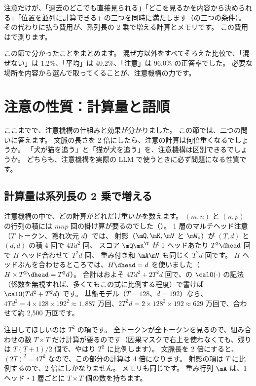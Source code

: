 注意だけが、「過去のどこでも直接見られる」「どこを見るかを内容から決められる」「位置を並列に計算できる」の三つを同時に満たします（の三つの条件）。
その代わりに払う費用が、系列長の 2 乗で増える計算とメモリです。
この費用はで測ります。

この節で分かったことをまとめます。
混ぜ方以外をすべてそろえた比較で、「混ぜない」は 1.2\%、「平均」は 40.2\%、「注意」は 96.0\% の正答率でした。
必要な場所を内容から選んで取ってくることが、注意機構の力です。

\section{注意の性質：計算量と語順}\label{sec:attn-properties}

ここまでで、注意機構の仕組みと効果が分かりました。
この節では、二つの問いに答えます。
文脈の長さを 2 倍にしたら、注意の計算は何倍重くなるでしょうか。
「犬が猫を追う」と「猫が犬を追う」を、注意機構は区別できるでしょうか。
どちらも、注意機構を実際の LLM で使うときに必ず問題になる性質です。

\subsection*{計算量は系列長の 2 乗で増える}

注意機構の中で、どの計算がどれだけ重いかを数えます。
$(m,n)$ と $(n,p)$ の行列の積には $mnp$ 回の掛け算が要るのでした（）。
1 層のマルチヘッド注意（$T$ トークン、隠れ次元 $d$）では、
射影（$\mQ,\mK,\mV$ と $\mW_o$）が $(T,d)$ と $(d,d)$ の積 4 回で $4Td^2$ 回、
スコア $\mQ\mK^\T$ が 1 ヘッドあたり $T^2\dhead$ 回で $H$ ヘッド合わせて $T^2d$ 回、
重み付き和 $\mA\mV$ も同じく $T^2d$ 回です。
$H$ ヘッドぶんを合わせるところでは、$H\dhead=d$ を使いました（$H\times T^2\dhead=T^2d$）。
合計はおよそ $4Td^2 + 2T^2d$ 回で、の $\calO(\cdot)$ の記法（係数を無視すれば、多くてもこの式に比例する程度）で書けば $\calO(Td^2 + T^2d)$ です。
基盤モデル（$T=128$、$d=192$）なら、$4Td^2=4\times128\times192^2\approx1{,}887$ 万回、$2T^2d=2\times128^2\times192\approx629$ 万回で、合わせて約 2,500 万回です。

注目してほしいのは $T^2$ の項です。
全トークンが全トークンを見るので、組み合わせの数 $T\times T$ だけ計算が要るのです（因果マスクで右上を使わなくても、残りは $T(T+1)/2$ 個で、やはり $T^2$ に比例します）。
文脈長を 2 倍にすると、$(2T)^2=4T^2$ なので、この部分の計算は 4 倍になります。
射影の項は $T$ に比例するので、2 倍にしかなりません。
メモリも同じです。
重み行列 $\mA$ は、1 ヘッド・1 層ごとに $T\times T$ 個の数を持ちます。

